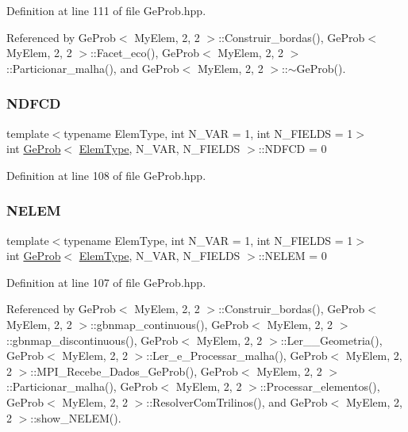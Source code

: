 Definition at line 111 of file Ge\+Prob.\+hpp.



Referenced by Ge\+Prob$<$ My\+Elem, 2, 2 $>$\+::\+Construir\+\_\+bordas(), Ge\+Prob$<$ My\+Elem, 2, 2 $>$\+::\+Facet\+\_\+eco(), Ge\+Prob$<$ My\+Elem, 2, 2 $>$\+::\+Particionar\+\_\+malha(), and Ge\+Prob$<$ My\+Elem, 2, 2 $>$\+::$\sim$\+Ge\+Prob().

\mbox{\label{classGeProb_a2894b14d50728f945721f2c85e1fba4d}} 
\subsubsection{\texorpdfstring{N\+D\+F\+CD}{NDFCD}}
{\footnotesize\ttfamily template$<$typename Elem\+Type, int N\+\_\+\+V\+AR = 1, int N\+\_\+\+F\+I\+E\+L\+DS = 1$>$ \\
int \hyperlink{classGeProb}{Ge\+Prob}$<$ \hyperlink{spectral_8h_aaa2c1a7b2d1b12c590d730fe6ac839fa}{Elem\+Type}, N\+\_\+\+V\+AR, N\+\_\+\+F\+I\+E\+L\+DS $>$\+::N\+D\+F\+CD = 0\hspace{0.3cm}{\ttfamily [protected]}}



Definition at line 108 of file Ge\+Prob.\+hpp.

\mbox{\label{classGeProb_ac5a0f21b0737394d783b9ca32317ece8}} 
\subsubsection{\texorpdfstring{N\+E\+L\+EM}{NELEM}}
{\footnotesize\ttfamily template$<$typename Elem\+Type, int N\+\_\+\+V\+AR = 1, int N\+\_\+\+F\+I\+E\+L\+DS = 1$>$ \\
int \hyperlink{classGeProb}{Ge\+Prob}$<$ \hyperlink{spectral_8h_aaa2c1a7b2d1b12c590d730fe6ac839fa}{Elem\+Type}, N\+\_\+\+V\+AR, N\+\_\+\+F\+I\+E\+L\+DS $>$\+::N\+E\+L\+EM = 0\hspace{0.3cm}{\ttfamily [protected]}}



Definition at line 107 of file Ge\+Prob.\+hpp.



Referenced by Ge\+Prob$<$ My\+Elem, 2, 2 $>$\+::\+Construir\+\_\+bordas(), Ge\+Prob$<$ My\+Elem, 2, 2 $>$\+::gbnmap\+\_\+continuous(), Ge\+Prob$<$ My\+Elem, 2, 2 $>$\+::gbnmap\+\_\+discontinuous(), Ge\+Prob$<$ My\+Elem, 2, 2 $>$\+::\+Ler\+\_\+\+\_\+\+Geometria(), Ge\+Prob$<$ My\+Elem, 2, 2 $>$\+::\+Ler\+\_\+e\+\_\+\+Processar\+\_\+malha(), Ge\+Prob$<$ My\+Elem, 2, 2 $>$\+::\+M\+P\+I\+\_\+\+Recebe\+\_\+\+Dados\+\_\+\+Ge\+Prob(), Ge\+Prob$<$ My\+Elem, 2, 2 $>$\+::\+Particionar\+\_\+malha(), Ge\+Prob$<$ My\+Elem, 2, 2 $>$\+::\+Processar\+\_\+elementos(), Ge\+Prob$<$ My\+Elem, 2, 2 $>$\+::\+Resolver\+Com\+Trilinos(), and Ge\+Prob$<$ My\+Elem, 2, 2 $>$\+::show\+\_\+\+N\+E\+L\+E\+M().

